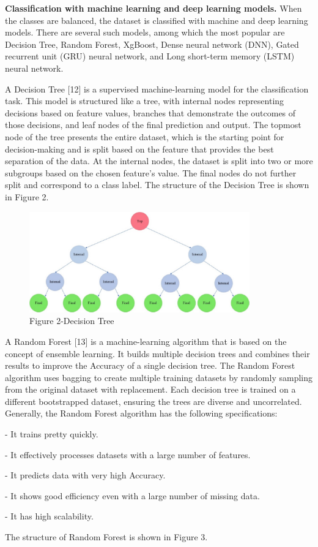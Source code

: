 \begin{multicols}{2}
{\bfseries Classification with machine learning and deep learning models.}
When the classes are balanced, the dataset is classified with machine
and deep learning models. There are several such models, among which the
most popular are Decision Tree, Random Forest, XgBoost, Dense neural
network (DNN), Gated recurrent unit (GRU) neural network, and Long
short-term memory (LSTM) neural network.

A Decision Tree {[}12{]} is a supervised machine-learning model for the
classification task. This model is structured like a tree, with internal
nodes representing decisions based on feature values, branches that
demonstrate the outcomes of those decisions, and leaf nodes of the final
prediction and output. The topmost node of the tree presents the entire
dataset, which is the starting point for decision-making and is split
based on the feature that provides the best separation of the data. At
the internal nodes, the dataset is split into two or more subgroups
based on the chosen feature's value. The final nodes do not further
split and correspond to a class label. The structure of the Decision
Tree is shown in Figure 2.
\end{multicols}

\begin{figure}[H]
	\centering
	\includegraphics[width=0.85\textwidth]{media/ict/image39}
	\caption*{Figure 2-Decision Tree}
\end{figure}

\begin{multicols}{2}
A Random Forest {[}13{]} is a machine-learning algorithm that is based
on the concept of ensemble learning. It builds multiple decision trees
and combines their results to improve the Accuracy of a single decision
tree. The Random Forest algorithm uses bagging to create multiple
training datasets by randomly sampling from the original dataset with
replacement. Each decision tree is trained on a different bootstrapped
dataset, ensuring the trees are diverse and uncorrelated. Generally, the
Random Forest algorithm has the following specifications:

- It trains pretty quickly.

- It effectively processes datasets with a large number of features.

- It predicts data with very high Accuracy.

- It shows good efficiency even with a large number of missing data.

- It has high scalability.

The structure of Random Forest is shown in Figure 3.
\end{multicols}

